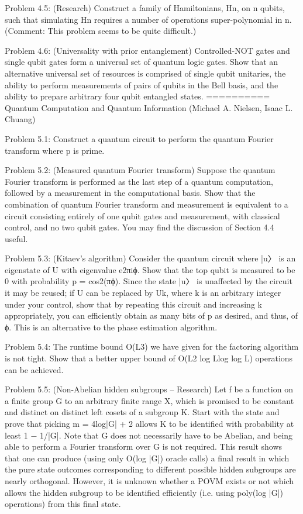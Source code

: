 \documentclass{article}
\newcommand{\0}{{$|0\rangle$}}
\newcommand{\1}{{$|1\rangle$}}
\newcommand{\2}{\frac{1}{\sqrt{2}}}
\begin{document}
Problem 4.5: (Research) Construct a family of Hamiltonians, {Hn}, on n qubits, such that simulating Hn requires a number of operations super-polynomial in n. (Comment: This problem seems to be quite difficult.)

Problem 4.6: (Universality with prior entanglement) Controlled-NOT gates and single qubit gates form a universal set of quantum logic gates. Show that an alternative universal set of resources is comprised of single qubit unitaries, the ability to perform measurements of pairs of qubits in the Bell basis, and the ability to prepare arbitrary four qubit entangled states.
==========
Quantum Computation and Quantum Information (Michael A. Nielsen, Isaac L. Chuang)

Problem 5.1: Construct a quantum circuit to perform the quantum Fourier transform where p is prime.

Problem 5.2: (Measured quantum Fourier transform) Suppose the quantum Fourier transform is performed as the last step of a quantum computation, followed by a measurement in the computational basis. Show that the combination of quantum Fourier transform and measurement is equivalent to a circuit consisting entirely of one qubit gates and measurement, with classical control, and no two qubit gates. You may find the discussion of Section 4.4 useful.

Problem 5.3: (Kitaev’s algorithm) Consider the quantum circuit where |u〉 is an eigenstate of U with eigenvalue e2πiϕ. Show that the top qubit is measured to be 0 with probability p = cos2(πϕ). Since the state |u〉 is unaffected by the circuit it may be reused; if U can be replaced by Uk, where k is an arbitrary integer under your control, show that by repeating this circuit and increasing k appropriately, you can efficiently obtain as many bits of p as desired, and thus, of ϕ. This is an alternative to the phase estimation algorithm.

Problem 5.4: The runtime bound O(L3) we have given for the factoring algorithm is not tight. Show that a better upper bound of O(L2 log Llog log L) operations can be achieved.

Problem 5.5: (Non-Abelian hidden subgroups – Research) Let f be a function on a finite group G to an arbitrary finite range X, which is promised to be constant and distinct on distinct left cosets of a subgroup K. Start with the state and prove that picking m = 4log|G| + 2 allows K to be identified with probability at least 1 − 1/|G|. Note that G does not necessarily have to be Abelian, and being able to perform a Fourier transform over G is not required. This result shows that one can produce (using only O(log |G|) oracle calls) a final result in which the pure state outcomes corresponding to different possible hidden subgroups are nearly orthogonal. However, it is unknown whether a POVM exists or not which allows the hidden subgroup to be identified efficiently (i.e. using poly(log |G|) operations) from this final state.
\end{document}
